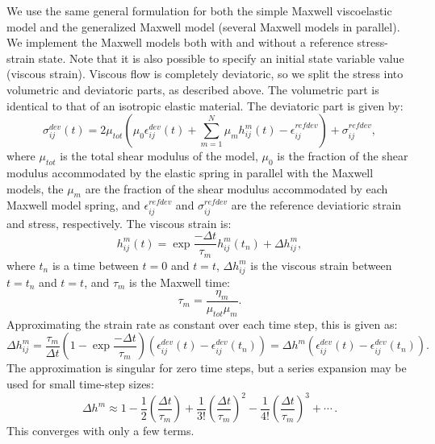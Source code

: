 We use the same general formulation for both the simple Maxwell
viscoelastic model and the generalized Maxwell model (several Maxwell
models in parallel). We implement the Maxwell models both with and
without a reference stress-strain state. Note that it is also possible
to specify an initial state variable value (viscous strain). Viscous
flow is completely deviatoric, so we split the stress into volumetric
and deviatoric parts, as described above.  The volumetric part is
identical to that of an isotropic elastic material. The deviatoric
part is given by:
\begin{equation}
  \sigma^\mathit{dev}_{ij}\left(t\right)=2\mu_{tot}\left(\mu_{0}\epsilon^\mathit{dev}_{ij}
    \left(t\right)+\sum_{m=1}^{N}\mu_{m}h^{m}_{ij}\left(t\right)-\epsilon^\mathit{refdev}_{ij}
    \right)+\sigma^\mathit{refdev}_{ij},
\end{equation}
where $\mu_{tot}$ is the total shear modulus of the model, $\mu_{0}$
is the fraction of the shear modulus accommodated by the elastic
spring in parallel with the Maxwell models, the $\mu_{m}$ are the
fraction of the shear modulus accommodated by each Maxwell model
spring, and $\epsilon^{\mathit{refdev}}_{ij}$ and
$\sigma^{\mathit{refdev}}_{ij}$ are the reference deviatioric strain
and stress, respectively. The viscous strain is:
\begin{equation}
h^{m}_{ij}\left(t\right)=\exp\frac{-\Delta
  t}{\tau_{m}}h^{m}_{ij}\left(t_{n}\right)+\Delta h^{m}_{ij},
\end{equation}
where $t_{n}$ is a time between $t=0$ and $t=t$, $\Delta
h^{m}_{ij}$ is the viscous strain between $t=t_{n}$ and
$t=t$, and $\tau_{m}$ is the Maxwell time:
\begin{equation}
  \tau_{m}=\frac{\eta_{m}}{\mu_{tot}\mu_{m}}.
\end{equation}
Approximating the strain rate as constant over each time step,
this is given as:
\begin{equation}
\Delta h^{m}_{ij}=\frac{\tau_{m}}{\Delta t}\left(1-\exp\frac{-\Delta
  t}{\tau_{m}}\right)\left(\epsilon^{\mathit{dev}}_{ij}\left(t\right)-\epsilon^{\mathit{dev}}_{ij}\left(t_{n}\right)\right)=\Delta
h^{m}\left(\epsilon^{\mathit{dev}}_{ij}\left(t\right)-\epsilon^{\mathit{dev}}_{ij}\left(t_n\right)\right).
\end{equation}
The approximation is singular for zero time steps, but a series
expansion may be used for small time-step sizes:
\begin{equation}
  \Delta h^{m}\approx1-\frac{1}{2}\left(\frac{\Delta
    t}{\tau_{m}}\right)+\frac{1}{3!}\left(\frac{\Delta
    t}{\tau_{m}}\right)^{2}-\frac{1}{4!}\left(\frac{\Delta
    t}{\tau_{m}}\right)^{3}+\cdots\,.
\end{equation}
This converges with only a few terms.


